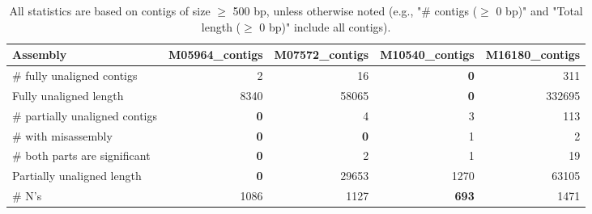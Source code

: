 \documentclass[12pt,a4paper]{article}
\begin{document}
\begin{table}[ht]
\begin{center}
\caption{All statistics are based on contigs of size $\geq$ 500 bp, unless otherwise noted (e.g., "\# contigs ($\geq$ 0 bp)" and "Total length ($\geq$ 0 bp)" include all contigs).}
\begin{tabular}{|l*{4}{|r}|}
\hline
Assembly & M05964\_contigs & M07572\_contigs & M10540\_contigs & M16180\_contigs \\ \hline
\# fully unaligned contigs & 2 & 16 & {\bf 0} & 311 \\ \hline
Fully unaligned length & 8340 & 58065 & {\bf 0} & 332695 \\ \hline
\# partially unaligned contigs & {\bf 0} & 4 & 3 & 113 \\ \hline
\hspace{5mm}\# with misassembly & {\bf 0} & {\bf 0} & 1 & 2 \\ \hline
\hspace{5mm}\# both parts are significant & {\bf 0} & 2 & 1 & 19 \\ \hline
Partially unaligned length & {\bf 0} & 29653 & 1270 & 63105 \\ \hline
\# N's & 1086 & 1127 & {\bf 693} & 1471 \\ \hline
\end{tabular}
\end{center}
\end{table}
\end{document}
